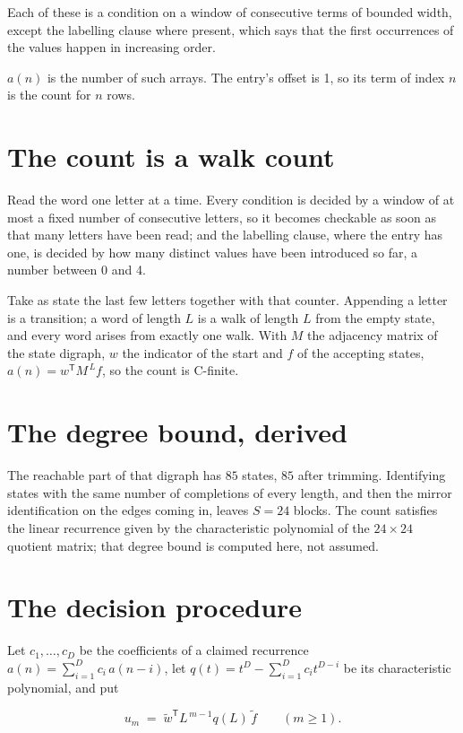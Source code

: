 \documentclass[11pt]{article}
\theoremstyle{definition}
\begin{document}
Each of these is a condition on a window of consecutive terms of bounded width, except the labelling clause where present, which says that the first occurrences of the values happen in increasing order.

$a(n)$ is the number of such arrays. The entry's offset is 1, so its term of index $n$ is the count for $n$ rows.

\section{The count is a walk count}

Read the word one letter at a time. Every condition is decided by a window of at most a fixed number of consecutive letters, so it becomes checkable as soon as that many letters have been read; and the labelling clause, where the entry has one, is decided by how many distinct values have been introduced so far, a number between $0$ and 4.

Take as state the last few letters together with that counter. Appending a letter is a transition; a word of length $L$ is a walk of length $L$ from the empty state, and every word arises from exactly one walk. With $M$ the adjacency matrix of the state digraph, $w$ the indicator of the start and $f$ of the accepting states, $a(n) = w^{\mathsf T}M^{\,L}f$, so the count is C-finite.

\section{The degree bound, derived}

The reachable part of that digraph has $85$ states, $85$ after trimming. Identifying states with the same number of completions of every length, and then the mirror identification on the edges coming in, leaves $S = 24$ blocks. The count satisfies the linear recurrence given by the characteristic polynomial of the $24\times24$ quotient matrix; that degree bound is computed here, not assumed.

\section{The decision procedure}

Let $c_1,\dots,c_D$ be the coefficients of a claimed recurrence $a(n) = \sum_{i=1}^{D} c_i\,a(n-i)$, let $q(t) = t^{D} - \sum_{i=1}^{D} c_i t^{D-i}$ be its characteristic polynomial, and put

\[u_m \;=\; \tilde w^{\mathsf T} L^{\,m-1} q(L)\,\tilde f \qquad (m \ge 1).\]
\end{document}

